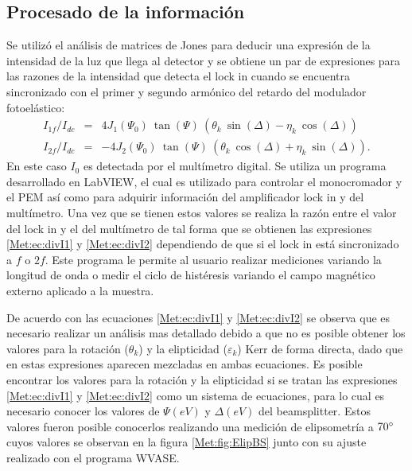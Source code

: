 \documentclass[paper=letter, fontsize=12pt]{scrartcl}
\numberwithin{equation}{section}		%
\numberwithin{figure}{section}			%
\numberwithin{table}{section}				%
\begin{document}
\subsection{Procesado de la informaci\'on}
Se utiliz\'o el an\'alisis de matrices de Jones \cite{fuji_2005} para deducir una expresi\'on de la intensidad de la luz que llega al detector y  se obtiene un par de expresiones para las razones de la intensidad que detecta el lock in cuando se encuentra sincronizado con el primer y segundo arm\'onico del retardo del modulador fotoel\'astico:
\begin{eqnarray}
	I_{1f}/I_{dc} &=& 4 J_1 (\Psi_0) ~\tan(\varPsi) ~(\theta_k ~\sin(\Delta) - \eta_k~ \cos(\Delta)) \label{Met:ec:divI1}\\
	I_{2f}/I_{dc} &=& -4 J_2 (\Psi_0) ~\tan(\varPsi) ~(\theta_k~\cos(\Delta) + \eta_k ~ \sin(\Delta)) \label{Met:ec:divI2}.
\end{eqnarray}
En este caso $I_0$ es detectada por el mult\'imetro digital. Se utiliza un programa desarrollado en LabVIEW, el cual es utilizado para controlar el monocromador  y el PEM as\'i como para adquirir informaci\'on del amplificador lock in y del mult\'imetro. Una vez que se tienen estos valores se realiza la raz\'on entre el valor del lock in y el del mult\'imetro de tal forma que se obtienen las expresiones \ref{Met:ec:divI1} y \ref{Met:ec:divI2} dependiendo de que si el lock in est\'a sincronizado a $f$ o $2f$.  Este programa le permite al usuario realizar mediciones variando la longitud de onda o medir el ciclo de hist\'eresis variando el campo magn\'etico externo aplicado a la muestra.
\newline
\par De acuerdo con las ecuaciones \ref{Met:ec:divI1} y \ref{Met:ec:divI2} se observa que es necesario realizar un an\'alisis mas detallado debido a que no es posible obtener los valores  para la rotaci\'on ($\theta_k$) y la elipticidad ($\varepsilon_k$) Kerr de forma directa, dado  que en estas expresiones aparecen mezcladas en ambas ecuaciones. Es posible encontrar los valores para la rotaci\'on  y la elipticidad si se tratan las expresiones \ref{Met:ec:divI1} y \ref{Met:ec:divI2} como un sistema de ecuaciones, para lo cual es necesario conocer los valores de $\varPsi (eV)$ y $\Delta (eV)$ del beamsplitter. Estos valores fueron posible conocerlos realizando una medici\'on de elipsometr\'ia a $70\degree$ cuyos valores se observan en la figura \ref{Met:fig:ElipBS} junto con su ajuste realizado con el programa WVASE. 
\end{document}
